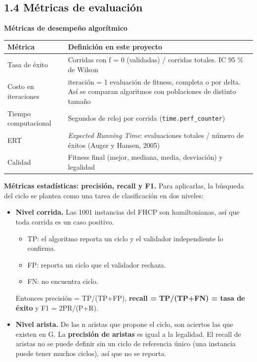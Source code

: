 \documentclass[
  spanish,
  12pt,
]{article}
\newcounter{none} %
\providecommand{\tightlist}{%
  \setlength{\itemsep}{0pt}\setlength{\parskip}{0pt}}
\begin{document}
\subsection{1.4 Métricas de
evaluación}\label{muxe9tricas-de-evaluaciuxf3n}

\textbf{Métricas de desempeño algorítmico}

{\def\LTcaptype{none} %
\begin{longtable}[]{@{}
  >{\raggedright\arraybackslash}p{}
  >{\raggedright\arraybackslash}p{}@{}}
\toprule\noalign{}
\begin{minipage}[b]{\linewidth}\raggedright
Métrica
\end{minipage} & \begin{minipage}[b]{\linewidth}\raggedright
Definición en este proyecto
\end{minipage} \\
\midrule\noalign{}
\endhead
\bottomrule\noalign{}
\endlastfoot
Tasa de éxito & Corridas con f = 0 (validadas) / corridas totales. IC 95
\% de Wilson \\
Costo en iteraciones & 1 iteración = 1 evaluación de fitness, completa o
por delta. Así se comparan algoritmos con poblaciones de distinto
tamaño \\
Tiempo computacional & Segundos de reloj por corrida
(\texttt{time.perf\_counter}) \\
ERT & \emph{Expected Running Time}: evaluaciones totales / número de
éxitos (Auger y Hansen, 2005) \\
Calidad & Fitness final (mejor, mediana, media, desviación) y
legalidad \\
\end{longtable}
}

\textbf{Métricas estadísticas: precisión, recall y F1.} Para aplicarlas,
la búsqueda del ciclo se plantea como una tarea de clasificación en dos
niveles:

\begin{itemize}
\tightlist
\item
  \textbf{Nivel corrida.} Las 1001 instancias del FHCP son
  hamiltonianas, así que toda corrida es un caso positivo.

  \begin{itemize}
  \tightlist
  \item
    TP: el algoritmo reporta un ciclo y el validador independiente lo
    confirma.
  \item
    FP: reporta un ciclo que el validador rechaza.
  \item
    FN: no encuentra ciclo.
  \end{itemize}

  Entonces precisión = TP/(TP+FP), \textbf{recall = TP/(TP+FN) = tasa de
  éxito} y F1 = 2PR/(P+R).
\item
  \textbf{Nivel arista.} De las n aristas que propone el ciclo, son
  aciertos las que existen en G. La \textbf{precisión de aristas} es
  igual a la legalidad. El recall de aristas no se puede definir sin un
  ciclo de referencia único (una instancia puede tener muchos ciclos),
  así que no se reporta.
\end{itemize}
\end{document}
